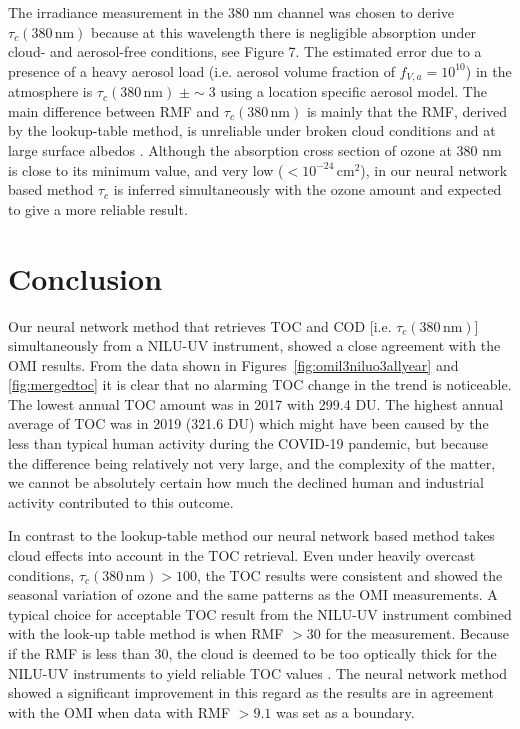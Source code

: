 \documentclass{optica-article}
\begin{document}
The irradiance measurement in the 380 nm channel was chosen to derive $\tau_c{\scriptstyle(380 \, \text{nm})}$ because at this wavelength there is negligible absorption under cloud- and aerosol-free conditions, see \cite{Sztipanov:2023} Figure 7. 
The estimated error due to a presence of a heavy aerosol load (i.e. aerosol volume fraction of ${f_{V,a}} =  10^{10}$) in the atmosphere is $\tau_c(380 \, \text{nm})\; \pm \sim 3$ using a location specific aerosol model.
The main difference between RMF and $\tau_c{\scriptstyle(380 \, \text{nm})}$ is mainly that the RMF, derived by the lookup-table method, is unreliable under broken cloud conditions and at large surface albedos \cite{Hoiskar2003}. 
Although the absorption cross section of ozone at 380 nm is close to its minimum value, and very low ($ < 10^{-24} \, \text{cm}^2$), in our neural network based method $\tau_c$ is inferred simultaneously with the ozone amount and expected to give a more reliable result. 

\section{Conclusion}
\label{sec-conclusion}

Our neural network method that retrieves TOC and COD [i.e. $\tau_c{\scriptstyle(380 \, \text{nm})}$] simultaneously from a NILU-UV instrument, showed a close agreement with the OMI results.
From the data shown in Figures~\ref{fig:omil3niluo3allyear} and \ref{fig:mergedtoc} it is clear that no alarming TOC change in the trend is noticeable. 
The lowest annual TOC amount was in 2017 with 299.4 DU. 
The highest annual average of TOC was in 2019 (321.6 DU) which might have been caused by the less than typical human activity during the COVID-19 pandemic, but because the difference being relatively not very large, and the complexity of the matter, we cannot be absolutely certain how much the declined human and industrial activity contributed to this outcome.

In contrast to the lookup-table method our neural network based method takes cloud effects into account in the TOC retrieval.
Even under heavily overcast conditions, $\tau_c{\scriptstyle(380 \, \text{nm})} > 100$, the TOC results were consistent and  showed the seasonal variation of ozone and the same patterns as the OMI measurements.
A typical choice for acceptable TOC result from the NILU-UV instrument combined with the look-up table method is when RMF $>30$ for the measurement. 
Because if the RMF is less than 30, the cloud is deemed to be too optically thick for the NILU-UV instruments to yield reliable TOC values \cite{Fan:2014b}.
The neural network method showed a significant improvement in this regard as the results are in agreement with the OMI when data with RMF $>9.1$ was set as a boundary.
\end{document}
